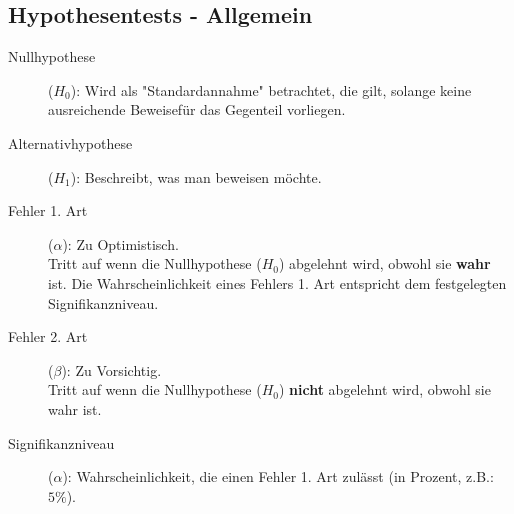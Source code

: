 \subsection{Hypothesentests - Allgemein}

\label{sec:hypothesengrundlagen}

\begin{description}
    \item[Nullhypothese] ($H_0$): 
        Wird als "Standardannahme" betrachtet, die gilt, solange keine
        ausreichende Beweisefür das Gegenteil vorliegen.

    \item[Alternativhypothese] ($H_1$): 
        Beschreibt, was man beweisen möchte. 

    \item[Fehler 1. Art] ($\alpha$): 
        Zu Optimistisch. \\
        Tritt auf wenn die Nullhypothese ($H_0$)
        abgelehnt wird, obwohl sie \textbf{wahr} ist.
        Die Wahrscheinlichkeit eines Fehlers 1. Art entspricht dem festgelegten
        Signifikanzniveau.

    \item[Fehler 2. Art] ($\beta$): 
        Zu Vorsichtig. \\
        Tritt auf wenn die Nullhypothese ($H_0$)
        \textbf{nicht} abgelehnt wird, obwohl sie wahr ist.

    \item[Signifikanzniveau] ($\alpha$): 
        Wahrscheinlichkeit, die einen
        Fehler 1. Art zulässt (in Prozent, z.B.: $5\%$).

\end{description}

\vspace{1cm}


